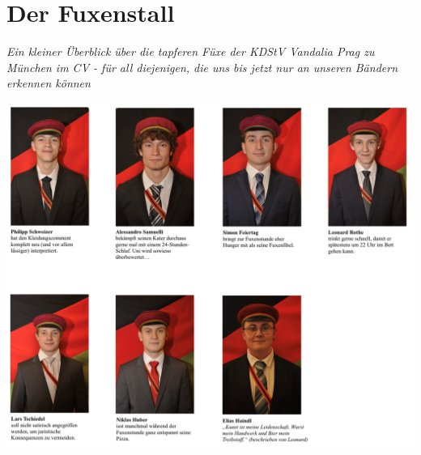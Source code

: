\section{Der Fuxenstall}

\begin{multicols}{2}





\textit{Ein kleiner Überblick über die tapferen Füxe der KDStV
Vandalia Prag zu München im CV - für all diejenigen, die uns bis jetzt nur an
unseren Bändern erkennen können}


\end{multicols}


\begin{figurehere}
		\includegraphics[width=1\linewidth]{Bilder/Neue Bilder/Fuechse/Fuechse_Vorstellung}



	\end{figurehere}





